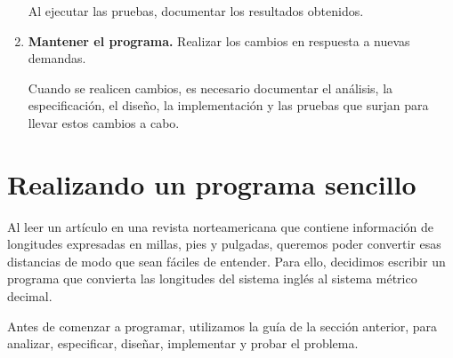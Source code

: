 \begin{enumerate}
\begin{observacion}
Al ejecutar las pruebas, documentar los resultados obtenidos.
\end{observacion}

\item {\bf Mantener el programa.} Realizar los cambios en
respuesta a nuevas demandas.

\begin{observacion}
Cuando se realicen cambios, es necesario documentar el análisis,
la especificación, el diseño, la implementación y las pruebas que surjan para
llevar estos cambios a cabo.
\end{observacion}

\end{enumerate}

\section{Realizando un programa sencillo}

Al leer un artículo en una revista norteamericana que contiene información de
longitudes expresadas en millas, pies y pulgadas, queremos poder convertir esas
distancias de modo que sean fáciles de entender.  Para ello, decidimos escribir
un programa que convierta las longitudes del sistema inglés al sistema métrico
decimal.

Antes de comenzar a programar, utilizamos la guía de la sección anterior, para
analizar, especificar, diseñar, implementar y probar el problema.

